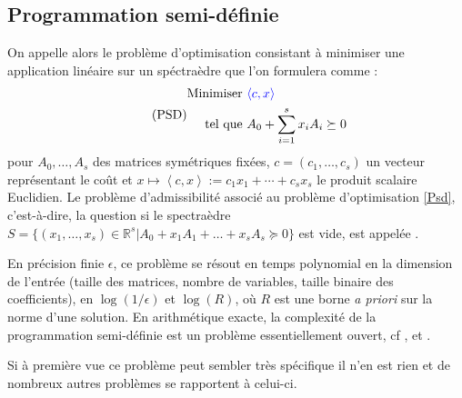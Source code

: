 \subsection{Programmation semi-définie}

On appelle alors  le problème d'optimisation
consistant à minimiser une application linéaire sur un spéctraèdre que l'on formulera comme :
\begin{equation}
  \tag{PSD}
\begin{aligned}
  \text{Minimiser } & {\color{blue} \left\langle c,x \right\rangle} \\
  \text{tel que }   & A_0 + \sum \limits_{i=1}^s x_{i}A_{i} \succeq 0
\end{aligned}
	\label{Psd} 
\end{equation}
pour $A_0,\ldots, A_s$ des matrices symétriques fixées, $c=(c_1,\ldots,c_s)$ un vecteur représentant le coût et $x \mapsto \left\langle c,x \right\rangle := c_1x_1+\cdots+c_sx_s$ le produit scalaire Euclidien. Le problème d'admissibilité associé au problème d'optimisation \eqref{Psd}, c'est-à-dire, la question si le spectraèdre $S = \{(x_1,\ldots,x_s) \in \mathbb{R}^s | A_0+ x_1A_1 + \ldots+ x_s A_s \succeq 0 \}$ est vide, est appelée .

En précision finie $\epsilon$, ce problème se résout en temps polynomial en la dimension de l'entrée (taille des matrices, nombre de variables, taille binaire des coefficients), en $\log(1/\epsilon)$ et $\log(R)$, où $R$ est une borne {\it a priori} sur la norme d'une solution. En arithmétique exacte, la complexité de la programmation semi-définie est un problème essentiellement ouvert, cf \cite[Sec.1.9]{deKlerk}, \cite{ramana1997exact,porkolab1997complexity} et \cite{henrion2016exact}.

Si à première vue ce problème peut sembler très spécifique il n'en est rien et de nombreux autres problèmes se rapportent à celui-ci. 




